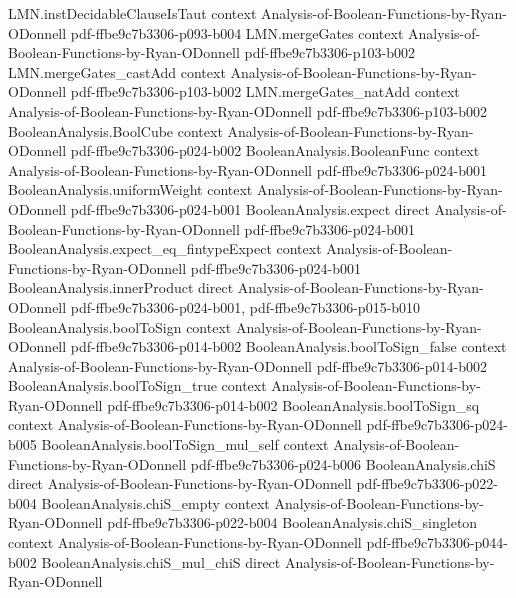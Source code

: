 \begin{theorem}
\proofstep
  {LMN.instDecidableClauseIsTaut}
  {context}
  {Analysis-of-Boolean-Functions-by-Ryan-ODonnell}
  {pdf-ffbe9c7b3306-p093-b004}
\proofstep
  {LMN.mergeGates}
  {context}
  {Analysis-of-Boolean-Functions-by-Ryan-ODonnell}
  {pdf-ffbe9c7b3306-p103-b002}
\proofstep
  {LMN.mergeGates_castAdd}
  {context}
  {Analysis-of-Boolean-Functions-by-Ryan-ODonnell}
  {pdf-ffbe9c7b3306-p103-b002}
\proofstep
  {LMN.mergeGates_natAdd}
  {context}
  {Analysis-of-Boolean-Functions-by-Ryan-ODonnell}
  {pdf-ffbe9c7b3306-p103-b002}
\proofstep
  {BooleanAnalysis.BoolCube}
  {context}
  {Analysis-of-Boolean-Functions-by-Ryan-ODonnell}
  {pdf-ffbe9c7b3306-p024-b002}
\proofstep
  {BooleanAnalysis.BooleanFunc}
  {context}
  {Analysis-of-Boolean-Functions-by-Ryan-ODonnell}
  {pdf-ffbe9c7b3306-p024-b001}
\proofstep
  {BooleanAnalysis.uniformWeight}
  {context}
  {Analysis-of-Boolean-Functions-by-Ryan-ODonnell}
  {pdf-ffbe9c7b3306-p024-b001}
\proofstep
  {BooleanAnalysis.expect}
  {direct}
  {Analysis-of-Boolean-Functions-by-Ryan-ODonnell}
  {pdf-ffbe9c7b3306-p024-b001}
\proofstep
  {BooleanAnalysis.expect_eq_fintypeExpect}
  {context}
  {Analysis-of-Boolean-Functions-by-Ryan-ODonnell}
  {pdf-ffbe9c7b3306-p024-b001}
\proofstep
  {BooleanAnalysis.innerProduct}
  {direct}
  {Analysis-of-Boolean-Functions-by-Ryan-ODonnell}
  {pdf-ffbe9c7b3306-p024-b001,
    pdf-ffbe9c7b3306-p015-b010}
\proofstep
  {BooleanAnalysis.boolToSign}
  {context}
  {Analysis-of-Boolean-Functions-by-Ryan-ODonnell}
  {pdf-ffbe9c7b3306-p014-b002}
\proofstep
  {BooleanAnalysis.boolToSign_false}
  {context}
  {Analysis-of-Boolean-Functions-by-Ryan-ODonnell}
  {pdf-ffbe9c7b3306-p014-b002}
\proofstep
  {BooleanAnalysis.boolToSign_true}
  {context}
  {Analysis-of-Boolean-Functions-by-Ryan-ODonnell}
  {pdf-ffbe9c7b3306-p014-b002}
\proofstep
  {BooleanAnalysis.boolToSign_sq}
  {context}
  {Analysis-of-Boolean-Functions-by-Ryan-ODonnell}
  {pdf-ffbe9c7b3306-p024-b005}
\proofstep
  {BooleanAnalysis.boolToSign_mul_self}
  {context}
  {Analysis-of-Boolean-Functions-by-Ryan-ODonnell}
  {pdf-ffbe9c7b3306-p024-b006}
\proofstep
  {BooleanAnalysis.chiS}
  {direct}
  {Analysis-of-Boolean-Functions-by-Ryan-ODonnell}
  {pdf-ffbe9c7b3306-p022-b004}
\proofstep
  {BooleanAnalysis.chiS_empty}
  {context}
  {Analysis-of-Boolean-Functions-by-Ryan-ODonnell}
  {pdf-ffbe9c7b3306-p022-b004}
\proofstep
  {BooleanAnalysis.chiS_singleton}
  {context}
  {Analysis-of-Boolean-Functions-by-Ryan-ODonnell}
  {pdf-ffbe9c7b3306-p044-b002}
\proofstep
  {BooleanAnalysis.chiS_mul_chiS}
  {direct}
  {Analysis-of-Boolean-Functions-by-Ryan-ODonnell}

\end{theorem}
